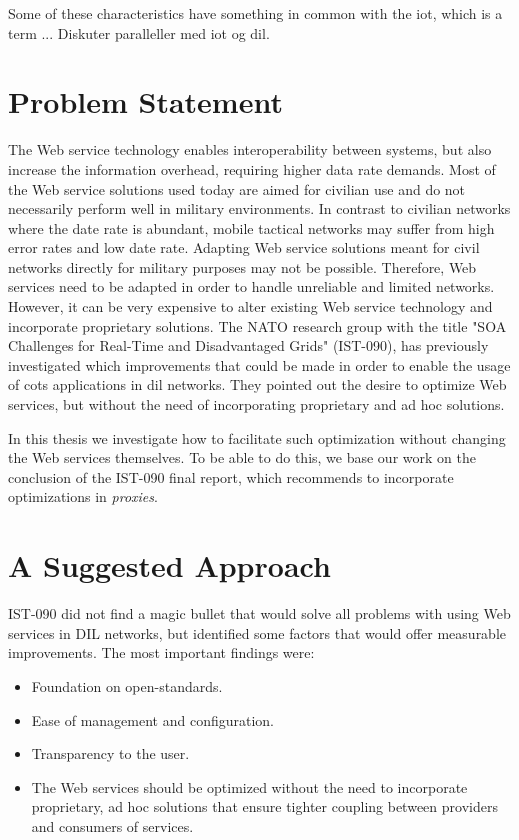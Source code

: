 Some of these characteristics have something in common with the \gls{iot}, which is a term ...
Diskuter paralleller med iot og dil.



\section{Problem Statement}
\label{section:problem-statement}

The Web service technology enables interoperability between systems, but also
increase the information overhead, requiring higher data rate demands. Most of
the Web service solutions used today are aimed for civilian use and do not
necessarily perform well in military environments. In contrast to civilian
networks where the date rate is abundant, mobile tactical networks may suffer
from high error rates and low date rate. Adapting Web service solutions meant
for civil networks directly for military purposes may not be possible.
Therefore, Web services need to be adapted in order to handle unreliable and
limited networks. However, it can be very expensive to alter existing Web
service technology and incorporate proprietary solutions. The NATO research
group with the title "SOA Challenges for Real-Time and Disadvantaged Grids"
(IST-090), has previously investigated which improvements that could be made in
order to enable the usage of \gls{cots} applications in \gls{dil} networks. They
pointed out the desire to optimize Web services, but without the need of
incorporating proprietary and ad hoc solutions.

In this thesis we investigate how to facilitate such optimization without
changing the Web services themselves. To be able to do this, we base our work on
the conclusion of the IST-090 final report\cite{ist-090}, which recommends to
incorporate optimizations in \textit{proxies}.

\section{A Suggested Approach}
\label{section:hypothesis}

IST-090 did not find a magic bullet that would solve all problems with using Web
services in DIL networks, but identified some factors that would offer measurable
improvements. The most important findings were:

\begin{itemize}

    \item Foundation on open-standards.

    \item Ease of management and configuration.

    \item Transparency to the user.

    \item The Web services should be optimized without the need to incorporate
    proprietary, ad hoc solutions that ensure tighter coupling between providers
    and consumers of services.

\end{itemize}

